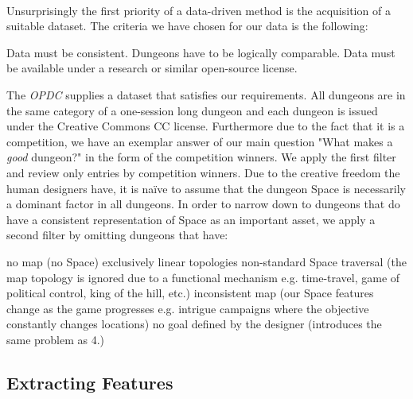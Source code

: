 \documentclass{UoYCSproject}
\begin{document}
\paragraph{}
Unsurprisingly the first priority of a data-driven method is the acquisition of a suitable dataset. The criteria we have chosen for our data is the following:
\begin{outline}[enumerate]
  \1 Data must be consistent. Dungeons have to be logically comparable.
  \1 Data must be available under a research or similar open-source license.
\end{outline}

The \textit{OPDC} supplies a dataset that satisfies our requirements. All dungeons are in the same category of a one-session long dungeon and each dungeon is issued under the Creative Commons CC license. Furthermore due to the fact that it is a competition, we have an exemplar answer of our main question "What makes a \textit{good} dungeon?" in the form of the competition winners. We apply the first filter and review only entries by competition winners. Due to the creative freedom the human designers have, it is na\"{i}ve to assume that the dungeon Space is necessarily a dominant factor in all dungeons. In order to narrow down to dungeons that do have a consistent representation of Space as an important asset, we apply a second filter by omitting dungeons that have:
\begin{outline}[enumerate]
  \1 no map (no Space)
  \1 exclusively linear topologies
  \1 non-standard Space traversal (the map topology is ignored due to a functional mechanism e.g. time-travel, game of political control, king of the hill, etc.)
  \1 inconsistent map (our Space features change as the game progresses e.g. intrigue campaigns where the objective constantly changes locations)
  \1 no goal defined by the designer (introduces the same problem as 4.)
\end{outline}

\subsection{Extracting Features}
\label{subsec:feature_extraction}
\end{document}
